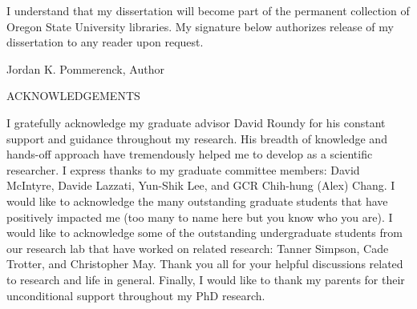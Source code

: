 \vspace{3.0cm}
\justify{}
I understand that my dissertation will become part of the permanent collection
of Oregon State University libraries. My signature below authorizes release of my dissertation to any reader upon request. \\
\vspace{0.5cm}
\begin{flushleft}
\underline{\hspace{15cm}}
\end{flushleft}
\centering{}
Jordan K. Pommerenck, Author

\newpage{}
\thispagestyle{empty}
\begin{center}
	\large
	ACKNOWLEDGEMENTS
\end{center}
\justify{}
\doublespacing
I gratefully acknowledge my graduate advisor David Roundy for his
constant support and guidance throughout my research. His breadth of knowledge
and hands-off approach have tremendously helped me to develop as a scientific
researcher.
I express thanks to my graduate committee members: David McIntyre, Davide Lazzati, Yun-Shik Lee, and GCR Chih-hung (Alex) Chang.
I would like to acknowledge the many outstanding graduate students that have positively impacted me (too many to name here but you know who you are).
I would like to acknowledge some of the outstanding undergraduate students
from our research lab that have worked on related research:
Tanner Simpson, Cade Trotter, and Christopher May.
Thank you all for your helpful discussions related to research and life in
general.
Finally, I would like to thank my parents for their unconditional support
throughout my PhD research.
